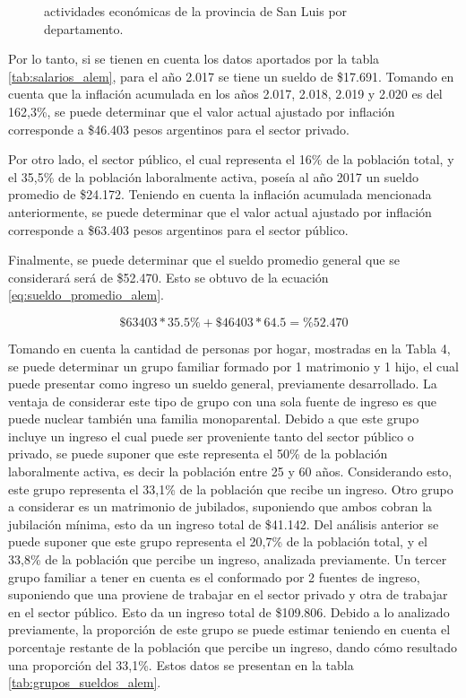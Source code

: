 \documentclass[11pt,a4paper]{article}
\begin{document}
\begin{figure}[ht!]
  \caption{actividades económicas de la provincia de San Luis por departamento.}
  \label{fig:econo_deptos}
\end{figure}

Por lo tanto, si se tienen en cuenta los datos aportados por la tabla \ref{tab:salarios_alem}, para el año 2.017 se tiene un sueldo de \$17.691. 
Tomando en cuenta que la inflación acumulada en los años 2.017, 2.018, 2.019 y 2.020 es del 162,3\%, se puede determinar que el valor actual ajustado por inflación corresponde a \$46.403 pesos argentinos para el sector privado.

Por otro lado, el sector público, el cual representa el 16\% de la población total, y el 35,5\% de la población laboralmente activa, poseía al año 2017 un sueldo promedio de \$24.172. 
Teniendo en cuenta la inflación acumulada mencionada anteriormente, se puede determinar que el valor actual ajustado por inflación corresponde a \$63.403 pesos argentinos para el sector público.

Finalmente, se puede determinar que el sueldo promedio general que se considerará será de \$52.470. Esto se obtuvo de la ecuación \ref{eq:sueldo_promedio_alem}.


\begin{equation}
    \$63403*35.5\% + \$46403*64.5=\%52.470
    \label{eq:sueldo_promedio_alem}
\end{equation}


Tomando en cuenta la cantidad de personas por hogar, mostradas en la Tabla 4, se puede determinar un grupo familiar formado por 1 matrimonio y 1 hijo, el cual puede presentar como ingreso un sueldo general, previamente desarrollado.
La ventaja de considerar este tipo de grupo con una sola fuente de ingreso es que puede nuclear también una familia monoparental.
Debido a que este grupo incluye un ingreso el cual puede ser proveniente tanto del sector público o privado, se puede suponer que este representa el 50\% de la población laboralmente activa, es decir la población entre 25 y 60 años.
Considerando esto, este grupo representa el 33,1\% de la población que recibe un ingreso.
Otro grupo a considerar es un matrimonio de jubilados, suponiendo que ambos cobran la jubilación mínima, esto da un ingreso total de \$41.142. 
Del análisis anterior se puede suponer que este grupo representa el 20,7\% de la población total, y el 33,8\% de la población que percibe un ingreso, analizada previamente. 
Un tercer grupo familiar a tener en cuenta es el conformado por 2 fuentes de ingreso, suponiendo que una proviene de trabajar en el sector privado y otra de trabajar en el sector público. 
Esto da un ingreso total de \$109.806.
Debido a lo analizado previamente, la proporción de este grupo se puede estimar teniendo en cuenta el porcentaje restante de la población que percibe un ingreso, dando cómo resultado una proporción del 33,1\%. Estos datos se presentan en la tabla \ref{tab:grupos_sueldos_alem}.
\end{document}
